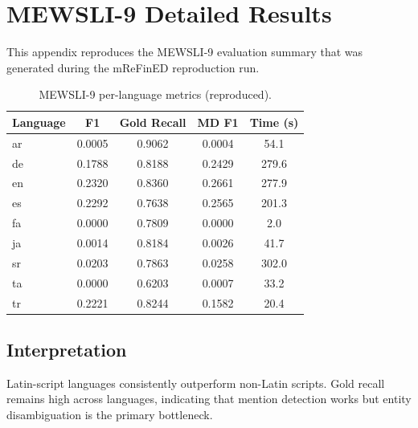 \chapter{MEWSLI-9 Detailed Results}
\label{AppendixB}

This appendix reproduces the MEWSLI-9 evaluation summary that was generated during the mReFinED reproduction run.

\begin{table}[ht]
\centering
\caption{MEWSLI-9 per-language metrics (reproduced).}
\begin{tabular}{lcccc}
\hline
Language & F1 & Gold Recall & MD F1 & Time (s) \\
\hline
ar & 0.0005 & 0.9062 & 0.0004 & 54.1 \\
de & 0.1788 & 0.8188 & 0.2429 & 279.6 \\
en & 0.2320 & 0.8360 & 0.2661 & 277.9 \\
es & 0.2292 & 0.7638 & 0.2565 & 201.3 \\
fa & 0.0000 & 0.7809 & 0.0000 & 2.0 \\
ja & 0.0014 & 0.8184 & 0.0026 & 41.7 \\
sr & 0.0203 & 0.7863 & 0.0258 & 302.0 \\
ta & 0.0000 & 0.6203 & 0.0007 & 33.2 \\
tr & 0.2221 & 0.8244 & 0.1582 & 20.4 \\
\hline
\end{tabular}
\end{table}

\section{Interpretation}
Latin-script languages consistently outperform non-Latin scripts. Gold recall remains high across languages, indicating that mention detection works but entity disambiguation is the primary bottleneck.
